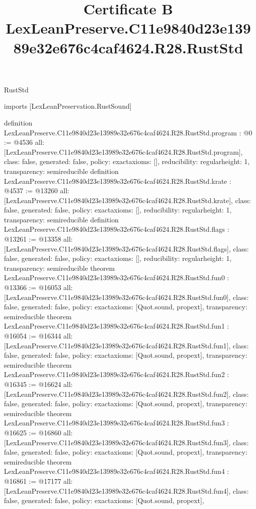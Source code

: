 \begin{lexlean}{RustStd}
\title{Certificate B LexLeanPreserve.C11e9840d23e13989e32e676c4caf4624.R28.RustStd}
\begin{coremodule}
imports [LexLeanPreservation.RustSound]

definition LexLeanPreserve.C11e9840d23e13989e32e676c4caf4624.R28.RustStd.program : @0 := @4536 {
  all: [LexLeanPreserve.C11e9840d23e13989e32e676c4caf4624.R28.RustStd.program],
  class: false,
  generated: false,
  policy: exact{axioms: []},
  reducibility: regular{height: 1},
  transparency: semireducible
}
definition LexLeanPreserve.C11e9840d23e13989e32e676c4caf4624.R28.RustStd.krate : @4537 := @13260 {
  all: [LexLeanPreserve.C11e9840d23e13989e32e676c4caf4624.R28.RustStd.krate],
  class: false,
  generated: false,
  policy: exact{axioms: []},
  reducibility: regular{height: 1},
  transparency: semireducible
}
definition LexLeanPreserve.C11e9840d23e13989e32e676c4caf4624.R28.RustStd.flags : @13261 := @13358 {
  all: [LexLeanPreserve.C11e9840d23e13989e32e676c4caf4624.R28.RustStd.flags],
  class: false,
  generated: false,
  policy: exact{axioms: []},
  reducibility: regular{height: 1},
  transparency: semireducible
}
theorem LexLeanPreserve.C11e9840d23e13989e32e676c4caf4624.R28.RustStd.fun0 : @13366 := @16053 {
  all: [LexLeanPreserve.C11e9840d23e13989e32e676c4caf4624.R28.RustStd.fun0],
  class: false,
  generated: false,
  policy: exact{axioms: [Quot.sound, propext]},
  transparency: semireducible
}
theorem LexLeanPreserve.C11e9840d23e13989e32e676c4caf4624.R28.RustStd.fun1 : @16054 := @16344 {
  all: [LexLeanPreserve.C11e9840d23e13989e32e676c4caf4624.R28.RustStd.fun1],
  class: false,
  generated: false,
  policy: exact{axioms: [Quot.sound, propext]},
  transparency: semireducible
}
theorem LexLeanPreserve.C11e9840d23e13989e32e676c4caf4624.R28.RustStd.fun2 : @16345 := @16624 {
  all: [LexLeanPreserve.C11e9840d23e13989e32e676c4caf4624.R28.RustStd.fun2],
  class: false,
  generated: false,
  policy: exact{axioms: [Quot.sound, propext]},
  transparency: semireducible
}
theorem LexLeanPreserve.C11e9840d23e13989e32e676c4caf4624.R28.RustStd.fun3 : @16625 := @16860 {
  all: [LexLeanPreserve.C11e9840d23e13989e32e676c4caf4624.R28.RustStd.fun3],
  class: false,
  generated: false,
  policy: exact{axioms: [Quot.sound, propext]},
  transparency: semireducible
}
theorem LexLeanPreserve.C11e9840d23e13989e32e676c4caf4624.R28.RustStd.fun4 : @16861 := @17177 {
  all: [LexLeanPreserve.C11e9840d23e13989e32e676c4caf4624.R28.RustStd.fun4],
  class: false,
  generated: false,
  policy: exact{axioms: [Quot.sound, propext]},
}
\end{coremodule}
\end{lexlean}
